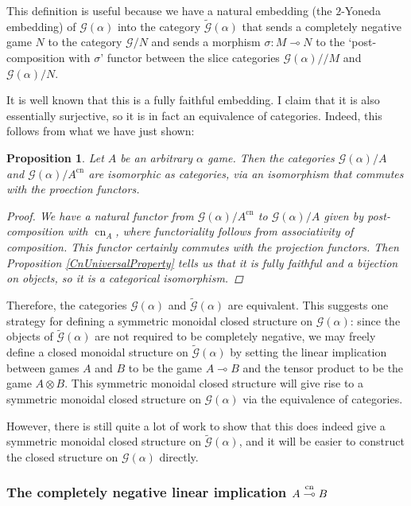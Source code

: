\documentclass[11pt]{article} %
\theoremstyle{plain} %
\newtheorem{proposition}[theorem]{Proposition}
\theoremstyle{definition} %
\theoremstyle{note}
\theoremstyle{exercisestyle}
\newcommand*\from{\colon}
\newcommand{\tensor}{\otimes}
\renewcommand{\implies}{\multimap}
\newcommand{\G}{\mathcal G}
\DeclareMathOperator{\cn}{cn}
\newcommand{\impliescn}{\protect\overset{\cn}{\implies}}
\begin{document}
This definition is useful because we have a natural embedding (the $2$-Yoneda embedding) of $\G(\alpha)$ into the category $\tilde{\G}(\alpha)$ that sends a completely negative game $N$ to the category $\G/N$ and sends a morphism $\sigma\from M\implies N$ to the `post-composition with $\sigma$' functor between the slice categories $\G(\alpha)//M$ and $\G(\alpha)/N$.  

It is well known that this is a fully faithful embedding.  I claim that it is also essentially surjective, so it is in fact an equivalence of categories.  Indeed, this follows from what we have just shown:

\begin{proposition}
  Let $A$ be an arbitrary $\alpha$ game.  Then the categories $\G(\alpha)/A$ and $\G(\alpha)/A^{\cn}$ are isomorphic as categories, via an isomorphism that commutes with the proection functors.

  \begin{proof}
    We have a natural functor from $\G(\alpha)/A^{\cn}$ to $\G(\alpha)/A$ given by post-composition with $\cn_A$, where functoriality follows from associativity of composition.  This functor certainly commutes with the projection functors.  Then Proposition \ref{CnUniversalProperty} tells us that it is fully faithful and a bijection on objects, so it is a categorical isomorphism.
  \end{proof}
\end{proposition}

Therefore, the categories $\G(\alpha)$ and $\tilde{\G}(\alpha)$ are equivalent.  This suggests one strategy for defining a symmetric monoidal closed structure on $\G(\alpha)$: since the objects of $\tilde{\G}(\alpha)$ are not required to be completely negative, we may freely define a closed monoidal structure on $\tilde{\G}(\alpha)$ by setting the linear implication between games $A$ and $B$ to be the game $A\implies B$ and the tensor product to be the game $A\tensor B$.  This symmetric monoidal closed structure will give rise to a symmetric monoidal closed structure on $\G(\alpha)$ via the equivalence of categories.  

However, there is still quite a lot of work to show that this does indeed give a symmetric monoidal closed structure on $\tilde{\G}(\alpha)$, and it will be easier to construct the closed structure on $\G(\alpha)$ directly.

\subsubsection{The completely negative linear implication $A\impliescn B$}
\end{document}
